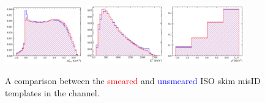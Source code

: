 \begin{figure}[!htb]
    \centering
    \includegraphics[width=0.3\textwidth]{./figs-fit-fit-variations/histo-comp/D0_iso_misID__vs__D0_iso_misID_smr__m2miss.pdf}
    \includegraphics[width=0.3\textwidth]{./figs-fit-fit-variations/histo-comp/D0_iso_misID__vs__D0_iso_misID_smr__el.pdf}
    \includegraphics[width=0.3\textwidth]{./figs-fit-fit-variations/histo-comp/D0_iso_misID__vs__D0_iso_misID_smr__q2.pdf}

    \caption{
        A comparison between the \textcolor{red}{smeared} and
        \textcolor{blue}{unsmeared} ISO skim misID templates in the \Dz channel.
    }
    \label{fig:unfolding-fit-vars-smear-iso}
\end{figure}
